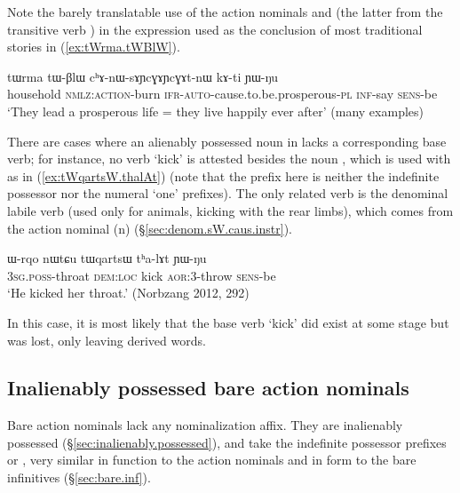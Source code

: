Note the barely translatable use of the action nominals  and  (the latter from the transitive verb ) in the expression used as the conclusion of most traditional stories in (\ref{ex:tWrma.tWBlW}).

\begin{exe}
\ex \label{ex:tWrma.tWBlW}
\gll  tɯrma tɯ-βlɯ cʰɤ-nɯ-sɤɲcɣɤɲcɣɤt-nɯ kɤ-ti ɲɯ-ŋu \\
household \textsc{nmlz}:\textsc{action}-burn \textsc{ifr}-\textsc{auto}-cause.to.be.prosperous-\textsc{pl} \textsc{inf}-say \textsc{sens}-be \\
\glt `They lead a prosperous life = they live happily ever after' (many examples)
\end{exe}


There are cases where an alienably possessed noun in  lacks a corresponding base verb; for instance, no verb  `kick' is attested besides the noun , which is used with  as in (\ref{ex:tWqartsW.thalAt}) (note that the  prefix here is neither the indefinite possessor nor the numeral `one' prefixes). The only related verb is the denominal labile verb  (used only for animals, kicking with the rear limbs), which comes from the action nominal  (n) (§\ref{sec:denom.sW.caus.instr}).

\begin{exe}
\ex \label{ex:tWqartsW.thalAt}
\gll  ɯ-rqo nɯtɕu tɯqartsɯ tʰa-lɤt ɲɯ-ŋu \\
\textsc{3sg}.\textsc{poss}-throat \textsc{dem}:\textsc{loc} kick \textsc{aor}:3\flobv{}-throw \textsc{sens}-be \\
\glt `He kicked her throat.' (Norbzang 2012, 292)
\end{exe}

In this case, it is most likely that the base verb  `kick' did exist at some stage but was lost, only leaving derived words.

\subsection{Inalienably possessed bare action nominals} \label{sec:bare.action.nominals}
Bare action nominals lack any nominalization affix. They are inalienably possessed (§\ref{sec:inalienably.possessed}), and take the indefinite possessor prefixes  or , very similar in function to the  action nominals and in form to the bare infinitives (§\ref{sec:bare.inf}).

